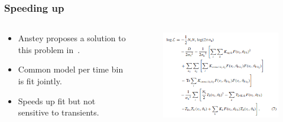 \documentclass{beamer}
\begin{document}
    \begin{frame}
    \frametitle{Speeding up}

    \begin{columns}[T]

        \begin{column}{0.5\textwidth}
            \begin{itemize}
                \item Anstey proposes a solution to this problem in~\cite{anstey2023use}.
                \item Common model per time bin is fit jointly.
                \item Speeds up fit but not sensitive to transients.
            \end{itemize}
        \end{column}

        \begin{column}{0.5\textwidth}
            \begin{figure}
                \includegraphics[width=\textwidth]{dom_timedep_math.png}
              \end{figure}
        \end{column}

      \end{columns}

      \end{frame}
\end{document}
